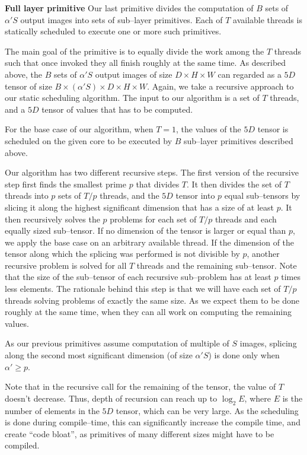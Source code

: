   {\bf Full layer primitive} \quad Our last primitive divides the
  computation of $B$ sets of $\alpha' S$ output images into sets of
  sub--layer primitives.  Each of $T$ available threads is statically
  scheduled to execute one or more such primitives.

  The main goal of the primitive is to equally divide the work among
  the $T$ threads such that once invoked they all finish roughly at
  the same time.  As described above, the $B$ sets of $\alpha'S$
  output images of size $D \times H \times W$ can regarded as a $5D$
  tensor of size $B \times (\alpha'S) \times D \times H \times W$.
  Again, we take a recursive approach to our static scheduling
  algorithm.  The input to our algorithm is a set of $T$ threads, and
  a $5D$ tensor of values that has to be computed.

  For the base case of our algorithm, when $T=1$, the values of the
  $5D$ tensor is scheduled on the given core to be executed by $B$
  sub--layer primitives described above.

  Our algorithm has two different recursive steps.  The first version
  of the recursive step first finds the smallest prime $p$ that
  divides $T$.  It then divides the set of $T$ threads into $p$ sets
  of $T/p$ threads, and the $5D$ tensor into $p$ equal sub--tensors by
  slicing it along the highest significant dimension that has a size
  of at least $p$.  It then recursively solves the $p$ problems for
  each set of $T/p$ threads and each equally sized sub--tensor.  If no
  dimension of the tensor is larger or equal than $p$, we apply the
  base case on an arbitrary available thread.  If the dimension of the
  tensor along which the splicing was performed is not divisible by
  $p$, another recursive problem is solved for all $T$ threads and the
  remaining sub--tensor.  Note that the size of the sub--tensor of
  each recursive sub--problem has at least $p$ times less elements.
  The rationale behind this step is that we will have each set of
  $T/p$ threads solving problems of exactly the same size.  As we
  expect them to be done roughly at the same time, when they can all
  work on computing the remaining values.

  As our previous primitives assume computation of multiple of $S$
  images, splicing along the second most significant dimension (of
  size $\alpha'S$) is done only when $\alpha' \ge p$.

  Note that in the recursive call for the remaining of the tensor, the
  value of $T$ doesn't decrease.  Thus, depth of recursion can reach
  up to $\log_2 E$, where $E$ is the number of elements in the $5D$
  tensor, which can be very large.  As the scheduling is done during
  compile--time, this can significantly increase the compile time, and
  create ``code bloat'', as primitives of many different sizes might
  have to be compiled.

